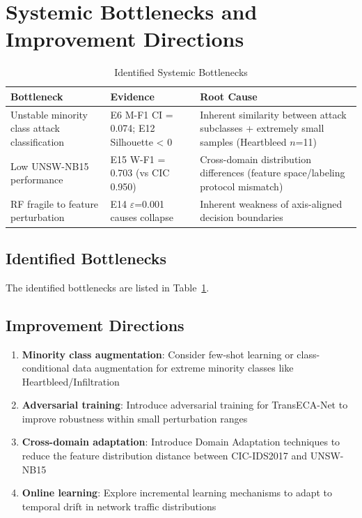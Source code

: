 \documentclass[sigconf]{acmart}
\begin{document}
\section{Systemic Bottlenecks and Improvement Directions}


\begin{table}[!t]
\caption{Identified Systemic Bottlenecks}
\label{tab:bottlenecks}
\begin{tabular}{p{4.4cm}p{3.4cm}p{8.0cm}}
\toprule
\textbf{Bottleneck} & \textbf{Evidence} & \textbf{Root Cause} \\
\midrule
Unstable minority class attack classification & E6 M-F1 CI = 0.074; E12 Silhouette < 0 & Inherent similarity between attack subclasses + extremely small samples (Heartbleed $n$=11) \\
Low UNSW-NB15 performance & E15 W-F1 = 0.703 (vs CIC 0.950) & Cross-domain distribution differences (feature space/labeling protocol mismatch) \\
RF fragile to feature perturbation & E14 $\varepsilon$=0.001 causes collapse & Inherent weakness of axis-aligned decision boundaries \\
\bottomrule
\end{tabular}
\end{table}

\subsection{Identified Bottlenecks} The identified bottlenecks are listed in Table~\ref{tab:bottlenecks}.

\subsection{Improvement Directions}

\begin{enumerate}
\item \textbf{Minority class augmentation}: Consider few-shot learning or class-conditional data augmentation for extreme minority classes like Heartbleed/Infiltration
\item \textbf{Adversarial training}: Introduce adversarial training for TransECA-Net to improve robustness within small perturbation ranges
\item \textbf{Cross-domain adaptation}: Introduce Domain Adaptation techniques to reduce the feature distribution distance between CIC-IDS2017 and UNSW-NB15
\item \textbf{Online learning}: Explore incremental learning mechanisms to adapt to temporal drift in network traffic distributions
\end{enumerate}
\end{document}
